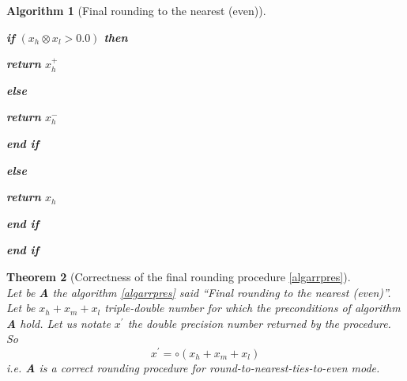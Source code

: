 \documentclass[a4paper,10pt,twoside]{article}
\newtheorem{theorem}{Theorem}[section]
\newtheorem{algorithm}[theorem]{Algorithm}
\newcommand{\hi}{\ensuremath{\mathit{h}}}
\newcommand{\mi}{\ensuremath{\mathit{m}}}
\newcommand{\lo}{\ensuremath{\mathit{l}}}
\newcommand{\ouvguill}{``}
\newcommand{\fermguill}{''}
\begin{document}
\begin{algorithm}[Final rounding to the nearest (even)]
\begin{center}
\begin{minipage}[b]{80mm}
\begin{center}
\begin{minipage}[b]{70mm}
\vspace{-2.4mm}
\begin{center}
\begin{minipage}[b]{60mm}
{\bf if} $\left( x_\hi \otimes x_\lo > 0.0 \right)$ {\bf then}
\vspace{-2.4mm}
\begin{center}
\begin{minipage}[b]{50mm}
\vspace{-2.4mm}
{\bf return } $x_\hi^+ $
\end{minipage}
\end{center}
\vspace{-2.4mm}
{\bf else}
\vspace{-2.4mm}
\begin{center}
\begin{minipage}[b]{50mm}
\vspace{-2.4mm}
{\bf return } $x_\hi^- $
\end{minipage}
\end{center}
\vspace{-2.4mm}
{\bf end if}
\end{minipage}
\end{center}
\vspace{-2.4mm}
{\bf else}
\vspace{-2.4mm}
\begin{center}
\begin{minipage}[b]{60mm}
\vspace{-2.4mm}
{\bf return } $x_\hi $
\end{minipage}
\end{center}
\vspace{-2.4mm}
{\bf end if}
\end{minipage}
\end{center}
\vspace{-2.4mm}
{\bf end if}
\end{minipage}
\end{center}
\end{algorithm}
\begin{theorem}[Correctness of the final rounding procedure \ref{algarrpres}]\label{corralgpluspres} ~\\
Let be {\bf A} the algorithm \ref{algarrpres} said \ouvguill Final rounding to the nearest (even)\fermguill.
Let be $x_\hi + x_\mi + x_\lo$ triple-double number for which the preconditions of algorithm {\bf A} hold.
Let us notate $x^\prime$ the double precision number returned by the procedure. \\
So
$$x^\prime = \circ \left( x_\hi + x_\mi + x_\lo \right)$$
i.e. {\bf A} is a correct rounding procedure for round-to-nearest-ties-to-even mode.
\end{theorem}
\end{document}
